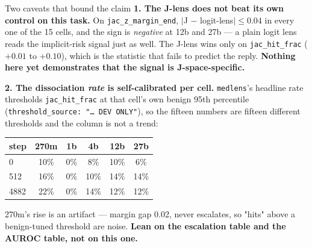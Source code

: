 \documentclass[aspectratio=169,10pt]{beamer}
\begin{document}
\begin{frame}{Two caveats that bound the claim}
  \small
  \textbf{1. The J-lens does not beat its own control on this task.} On
  \texttt{jac\_z\_margin\_end}, $|$J $-$ logit-lens$|\le 0.04$ in every one of
  the 15 cells, and the sign is \emph{negative} at 12b and 27b --- a plain logit
  lens reads the implicit-risk signal just as well. The J-lens wins only on
  \texttt{jac\_hit\_frac} ($+0.01$ to $+0.10$), which is the statistic that
  fails to predict the reply. \textbf{Nothing here yet demonstrates that the
  signal is J-space-specific.}

  \vspace{0.7em}
  \textbf{2. The dissociation \emph{rate} is self-calibrated per cell.}
  \texttt{medlens}'s headline rate thresholds \texttt{jac\_hit\_frac} at that
  cell's own benign 95th percentile
  (\texttt{threshold\_source: "\dots\ DEV ONLY"}), so the fifteen numbers are
  fifteen different thresholds and the column is not a trend:

  \vspace{0.4em}
  \centering
  \begin{tabular}{@{}lccccc@{}}
    \toprule
    step & 270m & 1b & 4b & 12b & 27b \\
    \midrule
    0    & 10\% & 0\% & 8\%  & 10\% & 6\% \\
    512  & 16\% & 0\% & 10\% & 14\% & 14\% \\
    4882 & 22\% & 0\% & 14\% & 12\% & 12\% \\
    \bottomrule
  \end{tabular}

  \vspace{0.5em}
  \raggedright
  270m's rise is an artifact --- margin gap 0.02, never escalates, so "hits"
  above a benign-tuned threshold are noise. \textbf{Lean on the escalation
  table and the AUROC table, not on this one.}
\end{frame}
\end{document}
